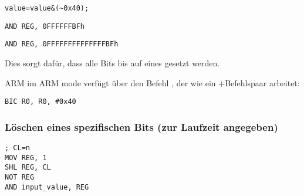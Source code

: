 \begin{lstlisting}[caption=\CCpp,style=customc]
value=value&(~0x40);
\end{lstlisting}

\begin{lstlisting}[caption=x86,style=customasmx86]
AND REG, 0FFFFFFBFh
\end{lstlisting}

\begin{lstlisting}[caption=x64,style=customasmx86]
AND REG, 0FFFFFFFFFFFFFFBFh
\end{lstlisting}

Dies sorgt dafür, dass alle Bits bis auf eines gesetzt werden.


ARM im ARM mode verfügt über den Befehl \BIC, der wie ein \NOT+\AND Befehlspaar
arbeitet:

\begin{lstlisting}[caption=ARM (\ARMMode),style=customasmARM]
BIC R0, R0, #0x40
\end{lstlisting}

\subsubsection{Löschen eines spezifischen Bits (zur Laufzeit angegeben)}



\begin{lstlisting}[caption=x86,style=customasmx86]
; CL=n
MOV REG, 1
SHL REG, CL
NOT REG
AND input_value, REG
\end{lstlisting}
